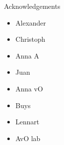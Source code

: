 \documentclass[10pt]{beamer}
\begin{document}
\appendix

\begin{frame}{Acknowledgements}
  \begin{itemize}
    \item Alexander
    \item Christoph
    \item Anna A
    \item Juan
    \item Anna vO
    \item Buys
    \item Lennart
    \item AvO lab
  \end{itemize}
\end{frame}


%
%
\end{document}
